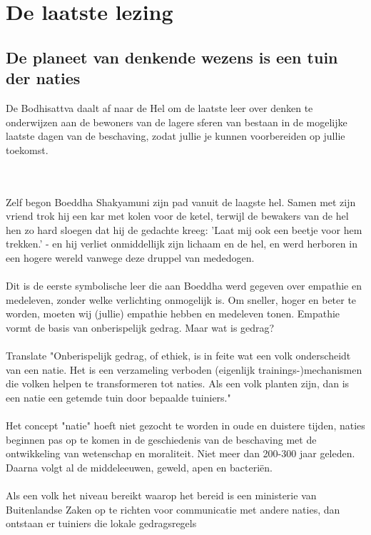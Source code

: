 \section{De laatste lezing}

\subsection{De planeet van denkende wezens is een tuin der naties}

De Bodhisattva daalt af naar de Hel om de laatste leer over
denken te onderwijzen aan de bewoners van de lagere sferen
van bestaan in de mogelijke laatste dagen van de beschaving,
zodat jullie je kunnen voorbereiden op jullie toekomst.

\\
\\
Zelf begon Boeddha Shakyamuni zijn pad vanuit de laagste hel.
Samen met zijn vriend trok hij een kar met kolen voor de ketel,
terwijl de bewakers van de hel hen zo hard sloegen dat hij de
gedachte kreeg: 'Laat mij ook een beetje voor hem trekken.' -
en hij verliet onmiddellijk zijn lichaam en de hel, en werd
herboren in een hogere wereld vanwege deze druppel van mededogen.
\\
\\
Dit is de eerste symbolische leer die aan Boeddha werd gegeven
over empathie en medeleven, zonder welke verlichting onmogelijk is.
Om sneller, hoger en beter te worden, moeten wij (jullie) empathie
hebben en medeleven tonen. Empathie vormt de basis van onberispelijk
gedrag. Maar wat is gedrag?
\\
\\
Translate "Onberispelijk gedrag, of ethiek, is in feite wat
een volk onderscheidt van een natie. Het is een verzameling
verboden (eigenlijk trainings-)mechanismen die volken helpen
te transformeren tot naties. Als een volk planten zijn, dan
is een natie een getemde tuin door bepaalde tuiniers."
\\
\\
Het concept "natie" hoeft niet gezocht te worden in oude en
duistere tijden, naties beginnen pas op te komen in de
geschiedenis van de beschaving met de ontwikkeling van
wetenschap en moraliteit. Niet meer dan 200-300 jaar geleden.
Daarna volgt al de middeleeuwen, geweld, apen en bacteriën.
\\
\\
Als een volk het niveau bereikt waarop het bereid is een
ministerie van Buitenlandse Zaken op te richten voor communicatie
met andere naties, dan ontstaan er tuiniers die lokale gedragsregels
